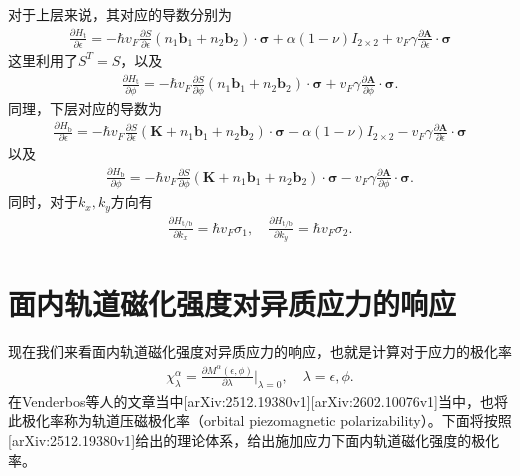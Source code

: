 \documentclass[10pt, oneside]{article}
\begin{document}
对于上层来说，其对应的导数分别为
\begin{align}
	\frac{\partial H_{\mathrm{t }}}{\partial \epsilon} = - \hbar v_{F} \frac{\partial S}{\partial \epsilon} \left(n_1 \bm{b }_1 + n_2 \bm{b }_2\right) \cdot \bm{\sigma} + \alpha \left(1 - \nu\right) I_{2 \times 2} + v_{F} \gamma \frac{\partial \bm{A }}{\partial \epsilon} \cdot \bm{\sigma}
\end{align}
这里利用了\(S^{T} = S\)，以及
\begin{align}
	\frac{\partial H_{\mathrm{t }}}{\partial \phi} = - \hbar v_{F} \frac{\partial S }{\partial \phi} \left(n_1 \bm{b }_1 + n_2 \bm{b }_2\right) \cdot \bm{\sigma} + v_{F} \gamma \frac{\partial \bm{A }}{\partial \phi} \cdot \bm{\sigma}.
\end{align}
同理，下层对应的导数为
\begin{align}
	\frac{\partial H_{\mathrm{b }}}{\partial \epsilon} = - \hbar v_{F} \frac{\partial S}{\partial \epsilon} \left(\bm{K} + n_1 \bm{b }_1 + n_2 \bm{b }_2\right) \cdot \bm{\sigma} - \alpha \left(1 - \nu\right) I_{2 \times 2} - v_{F} \gamma \frac{\partial \bm{A }}{\partial \epsilon} \cdot \bm{\sigma}
\end{align}
以及
\begin{align}
	\frac{\partial H_{\mathrm{b}}}{\partial \phi} = - \hbar v_{F} \frac{\partial S }{\partial \phi} \left(\bm{K} + n_1 \bm{b }_1 + n_2 \bm{b }_2\right) \cdot \bm{\sigma} - v_{F} \gamma \frac{\partial \bm{A }}{\partial \phi} \cdot \bm{\sigma}.	
\end{align}
同时，对于\(k_{x}, k_{y}\)方向有
\begin{align}
	\frac{\partial H_{\mathrm{t/b }}}{\partial {k_{x}}} = \hbar v_{F} \sigma_{1}, \quad \frac{\partial H_{\mathrm{t/b }}}{\partial k_{y}} = \hbar v_{F} \sigma_{2}.
\end{align}


\section{面内轨道磁化强度对异质应力的响应}
现在我们来看面内轨道磁化强度对异质应力的响应，也就是计算对于应力的极化率
\begin{align}
	\chi^{\alpha}_{\lambda} = \frac{\partial M^{\alpha} \left(\epsilon, \phi\right)}{\partial \lambda} \bigg|_{\lambda = 0}, \quad \lambda = \epsilon, \phi.
\end{align}
在Venderbos等人的文章当中[arXiv:2512.19380v1][arXiv:2602.10076v1]当中，也将此极化率称为轨道压磁极化率（orbital piezomagnetic polarizability）。下面将按照[arXiv:2512.19380v1]给出的理论体系，给出施加应力下面内轨道磁化强度的极化率。
\end{document}
